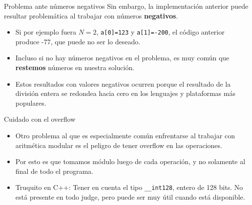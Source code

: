 \documentclass{beamer}
\begin{document}
\begin{frame}{Problema ante números negativos}
Sin embargo, la implementación anterior puede resultar problemática al trabajar con números \textbf{negativos}.

\begin{itemize}
    \item Si por ejemplo fuera $N=2$, \texttt{a[0]=123} y \texttt{a[1]=-200}, el código anterior produce -77, que puede no ser lo deseado.
    \item Incluso si no hay números negativos en el problema, es muy común que \textbf{restemos} números en nuestra solución.
    \item Estos resultados con valores negativos ocurren porque el resultado de la división entera se redondea hacia cero en los lenguajes y plataformas más populares.
    \pause
\end{itemize}

\end{frame}

\begin{frame}{Cuidado con el overflow}
\begin{itemize}
    \item Otro problema al que es especialmente común enfrentarse al trabajar con aritmética modular es el peligro de tener overflow en las operaciones.

    \item Por esto es que tomamos módulo luego de cada operación, y no solamente al final de todo el programa.
    
    \item Truquito en C++: Tener en cuenta el tipo \texttt{\_\_int128}, entero de 128 bits. No está presente en todo judge, pero puede ser muy útil cuando está disponible.

\end{itemize}
\end{frame}
\end{document}
